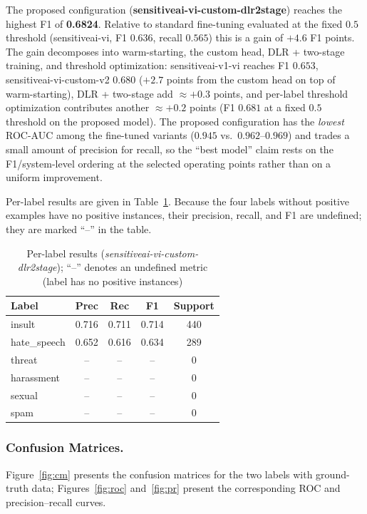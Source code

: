 \documentclass[runningheads]{llncs}
\begin{document}
The proposed configuration (\textbf{sensitiveai-vi-custom-dlr2stage}) reaches the highest F1 of \textbf{0.6824}. Relative to standard fine-tuning evaluated at the fixed $0.5$ threshold (sensitiveai-vi, F1 $0.636$, recall $0.565$) this is a gain of $+4.6$ F1 points. The gain decomposes into warm-starting, the custom head, DLR + two-stage training, and threshold optimization: sensitiveai-v1-vi reaches F1 $0.653$, sensitiveai-vi-custom-v2 $0.680$ ($+2.7$ points from the custom head on top of warm-starting), DLR + two-stage add $\approx +0.3$ points, and per-label threshold optimization contributes another $\approx +0.2$ points (F1 $0.681$ at a fixed $0.5$ threshold on the proposed model). The proposed configuration has the \emph{lowest} ROC-AUC among the fine-tuned variants ($0.945$ vs.\ $0.962$--$0.969$) and trades a small amount of precision for recall, so the ``best model'' claim rests on the F1/system-level ordering at the selected operating points rather than on a uniform improvement.

Per-label results are given in Table~\ref{tab:per_label}. Because the four labels without positive examples have no positive instances, their precision, recall, and F1 are undefined; they are marked ``--'' in the table.

\begin{table}
\centering\footnotesize
\caption{Per-label results (\textit{sensitiveai-vi-custom-dlr2stage}); ``--'' denotes an undefined metric (label has no positive instances)}\label{tab:per_label}
\begin{tabular}{@{}lcccc@{}}
\hline
\textbf{Label} & \textbf{Prec} & \textbf{Rec} & \textbf{F1} & \textbf{Support} \\
\hline
insult & 0.716 & 0.711 & 0.714 & 440 \\
hate\_speech & 0.652 & 0.616 & 0.634 & 289 \\
threat & -- & -- & -- & 0 \\
harassment & -- & -- & -- & 0 \\
sexual & -- & -- & -- & 0 \\
spam & -- & -- & -- & 0 \\
\hline
\end{tabular}
\end{table}

\subsubsection{Confusion Matrices.}
Figure~\ref{fig:cm} presents the confusion matrices for the two labels with ground-truth data; Figures~\ref{fig:roc} and~\ref{fig:pr} present the corresponding ROC and precision--recall curves.
\end{document}

